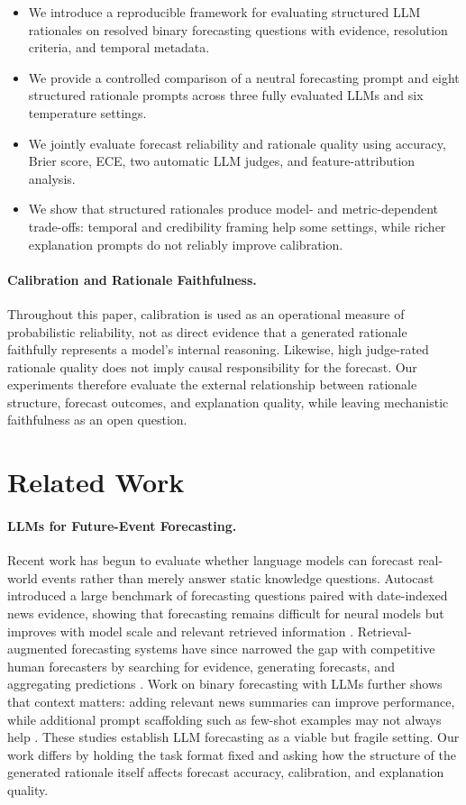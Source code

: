 \documentclass[11pt]{article}
\begin{document}
\begin{itemize}
    \item We introduce a reproducible framework for evaluating structured LLM rationales on resolved binary forecasting questions with evidence, resolution criteria, and temporal metadata.
    \item We provide a controlled comparison of a neutral forecasting prompt and eight structured rationale prompts across three fully evaluated LLMs and six temperature settings.
    \item We jointly evaluate forecast reliability and rationale quality using accuracy, Brier score, ECE, two automatic LLM judges, and feature-attribution analysis.
    \item We show that structured rationales produce model- and metric-dependent trade-offs: temporal and credibility framing help some settings, while richer explanation prompts do not reliably improve calibration.
\end{itemize}

\paragraph{Calibration and Rationale Faithfulness.}
Throughout this paper, calibration is used as an operational measure of probabilistic reliability, not as direct evidence that a generated rationale faithfully represents a model's internal reasoning.
Likewise, high judge-rated rationale quality does not imply causal responsibility for the forecast.
Our experiments therefore evaluate the external relationship between rationale structure, forecast outcomes, and explanation quality, while leaving mechanistic faithfulness as an open question.

\section{Related Work}

\paragraph{LLMs for Future-Event Forecasting.}
Recent work has begun to evaluate whether language models can forecast real-world events rather than merely answer static knowledge questions.
Autocast introduced a large benchmark of forecasting questions paired with date-indexed news evidence, showing that forecasting remains difficult for neural models but improves with model scale and relevant retrieved information \cite{zou2022forecasting}.
Retrieval-augmented forecasting systems have since narrowed the gap with competitive human forecasters by searching for evidence, generating forecasts, and aggregating predictions \cite{halawi2024approaching}.
Work on binary forecasting with LLMs further shows that context matters: adding relevant news summaries can improve performance, while additional prompt scaffolding such as few-shot examples may not always help \cite{mutschlechner2025context}.
These studies establish LLM forecasting as a viable but fragile setting.
Our work differs by holding the task format fixed and asking how the structure of the generated rationale itself affects forecast accuracy, calibration, and explanation quality.
\end{document}
